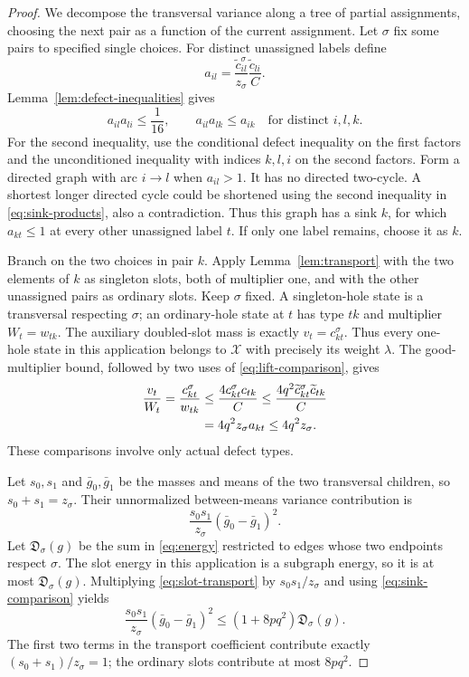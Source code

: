 \begin{proof}
We decompose the transversal variance along a tree of partial
assignments, choosing the next pair as a function of the current
assignment. Let $\sigma$ fix some pairs to specified single choices.
For distinct unassigned labels define
\[
 a_{il}=
  \frac{\widetilde c_{il}^{\sigma}}{z_\sigma}
  \frac{\widetilde c_{li}}{C}.
\]
Lemma~\ref{lem:defect-inequalities} gives
\begin{equation}
 a_{il}a_{li}\leq\frac1{16},
 \qquad
 a_{il}a_{lk}\leq a_{ik}
 \quad\text{for distinct }i,l,k.
 \label{eq:sink-products}
\end{equation}
For the second inequality, use the conditional defect inequality
on the first factors and the unconditioned inequality with indices
$k,l,i$ on the second factors.
Form a directed graph with arc $i\to l$ when $a_{il}>1$.
It has no directed two-cycle. A shortest longer directed cycle could
be shortened using the second inequality in
\eqref{eq:sink-products}, also a contradiction.
Thus this graph has a sink $k$, for which $a_{kt}\leq1$ at every other
unassigned label $t$. If only one label remains, choose it as $k$.

Branch on the two choices in pair $k$.
Apply Lemma~\ref{lem:transport} with the two elements of $k$ as
singleton slots, both of multiplier one, and with the other
unassigned pairs as ordinary slots. Keep $\sigma$ fixed.
A singleton-hole state is a transversal respecting $\sigma$; an
ordinary-hole state at $t$ has type $tk$ and multiplier $W_t=w_{tk}$.
The auxiliary doubled-slot mass is exactly $v_t=c_{kt}^\sigma$.
Thus every one-hole state in this application belongs to
$\mathcal X$ with precisely its weight $\lambda$.
The good-multiplier bound, followed by two uses of
\eqref{eq:lift-comparison}, gives
\begin{align}
 \frac{v_t}{W_t}
  =\frac{c_{kt}^\sigma}{w_{tk}}
  &\leq\frac{4c_{kt}^\sigma c_{tk}}{C}
   \leq\frac{4q^2\widetilde c_{kt}^\sigma
                        \widetilde c_{tk}}{C}
 \notag\\
  &=4q^2z_\sigma a_{kt}\leq4q^2z_\sigma.
 \label{eq:sink-comparison}
\end{align}
These comparisons involve only actual defect types.

Let $s_0,s_1$ and $\bar g_0,\bar g_1$ be the masses and means of the
two transversal children, so $s_0+s_1=z_\sigma$.
Their unnormalized between-means variance contribution is
\[
   \frac{s_0s_1}{z_\sigma}(\bar g_0-\bar g_1)^2.
\]
Let $\mathfrak D_\sigma(g)$ be the sum in
\eqref{eq:energy} restricted to edges whose two endpoints respect
$\sigma$. The slot energy in this application is a subgraph energy,
so it is at most $\mathfrak D_\sigma(g)$.
Multiplying \eqref{eq:slot-transport} by $s_0s_1/z_\sigma$ and using
\eqref{eq:sink-comparison} yields
\begin{equation}
 \frac{s_0s_1}{z_\sigma}(\bar g_0-\bar g_1)^2
 \leq (1+8pq^2)\mathfrak D_\sigma(g).
 \label{eq:conditional-variance-charge}
\end{equation}
The first two terms in the transport coefficient contribute exactly
$(s_0+s_1)/z_\sigma=1$; the ordinary slots contribute at most
$8pq^2$.


\end{proof}
